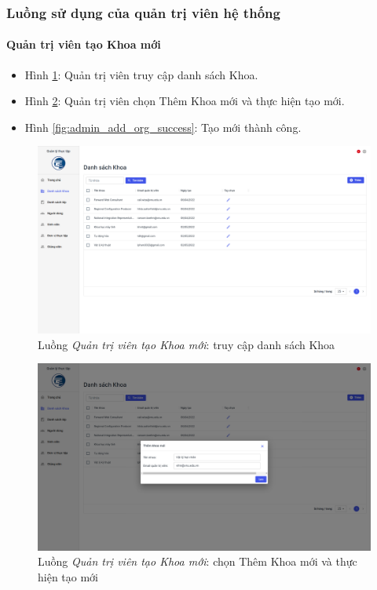 \documentclass[./../main.tex]{subfiles}
\begin{document}
\subsubsection{Luồng sử dụng của quản trị viên hệ thống}

\paragraph*{Quản trị viên tạo Khoa mới}

\begin{itemize}
	\item Hình \ref{fig:admin_access_list_orgs}: Quản trị viên truy cập danh sách Khoa.
	\item Hình \ref{fig:admin_add_org}: Quản trị viên chọn Thêm Khoa mới và thực hiện tạo mới.
	\item Hình \ref{fig:admin_add_org_success}: Tạo mới thành công.
\end{itemize}

\begin{figure}[]
	\includegraphics[width=\linewidth]{./images/image56.png}
	\caption{Luồng \emph{Quản trị viên tạo Khoa mới}: truy cập danh sách Khoa}
	\label{fig:admin_access_list_orgs}
\end{figure}

\begin{figure}[]
	\includegraphics[width=\linewidth]{./images/image57.png}
	\caption{Luồng \emph{Quản trị viên tạo Khoa mới}: chọn Thêm Khoa mới và thực hiện tạo mới}
	\label{fig:admin_add_org}
\end{figure}
\end{document}

